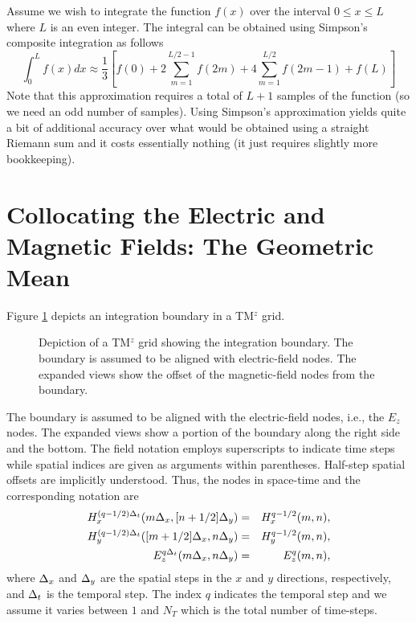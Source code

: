 Assume we wish to integrate the function $f(x)$ over the interval
$0\leq x\leq L$ where $L$ is an even integer.  The integral can be
obtained using Simpson's composite integration as follows
\begin{equation}
\int_0^L f(x) dx \approx
\frac{1}{3}\left[
f(0) + 2\sum_{m=1}^{L/2-1}f(2m) + 4\sum_{m=1}^{L/2}f(2m-1) + f(L)
\right]
\end{equation}
Note that this approximation requires a total of $L+1$ samples of the
function (so we need an odd number of samples).  Using Simpson's
approximation yields quite a bit of additional accuracy over what
would be obtained using a straight Riemann sum and it costs
essentially nothing (it just requires slightly more bookkeeping).


\section{Collocating the Electric and Magnetic Fields: The Geometric
Mean}

Figure \ref{fig:geometryNTFF} depicts an integration boundary in a
TM$^z$ grid.
\begin{figure}
\begin{center}
\vspace{-.1in}
\end{center}
\caption{Depiction of a TM$^z$ grid showing the integration boundary.
The boundary is assumed to be aligned with electric-field nodes.  The
expanded views show the offset of the magnetic-field nodes from the
boundary.}
\label{fig:geometryNTFF}
\end{figure}
The boundary is assumed to be aligned with the electric-field nodes,
i.e., the $E_z$ nodes.  The expanded views show a portion of the
boundary along the right side and the bottom.  The field notation
employs superscripts to indicate time steps while spatial indices are
given as arguments within parentheses.  Half-step spatial offsets are
implicitly understood.  Thus, the nodes in space-time and the
corresponding notation are
\begin{eqnarray}
H_x^{(q-1/2)\Delta_t}(m\Delta_x,[n+1/2]\Delta_y) &=&
  H_x^{q-1/2}(m,n), \\
H_y^{(q-1/2)\Delta_t}([m+1/2]\Delta_x,n\Delta_y) &=&
  H_y^{q-1/2}(m,n), \\
E_z^{q\Delta_t}(m\Delta_x,n\Delta_y) &=&
  E_z^{q}(m,n),
\end{eqnarray}
where $\Delta_x$ and $\Delta_y$ are the spatial steps in the $x$ and
$y$ directions, respectively, and $\Delta_t$ is the temporal step.
The index $q$ indicates the temporal step and we assume it varies
between $1$ and $N_T$ which is the total number of time-steps.

